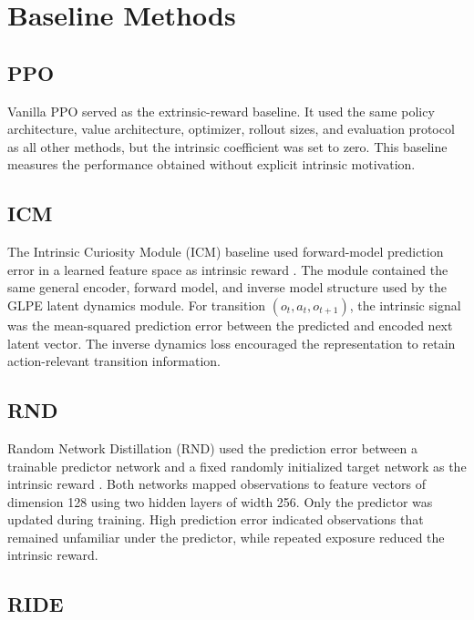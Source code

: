 \section{Baseline Methods}
\label{sec:methodology_baseline_methods}

\subsection{PPO}
\label{subsec:methodology_baseline_ppo}

Vanilla PPO served as the extrinsic-reward baseline.
It used the same policy architecture, value architecture, optimizer, rollout sizes, and evaluation protocol as all other methods, but the intrinsic coefficient was set to zero.
This baseline measures the performance obtained without explicit intrinsic motivation.

\subsection{ICM}
\label{subsec:methodology_baseline_icm}

The Intrinsic Curiosity Module (ICM) baseline used forward-model prediction error in a learned feature space as intrinsic reward \parencite{pathak-2017}.
The module contained the same general encoder, forward model, and inverse model structure used by the GLPE latent dynamics module.
For transition $(o_t,a_t,o_{t+1})$, the intrinsic signal was the mean-squared prediction error between the predicted and encoded next latent vector.
The inverse dynamics loss encouraged the representation to retain action-relevant transition information.

\subsection{RND}
\label{subsec:methodology_baseline_rnd}

Random Network Distillation (RND) used the prediction error between a trainable predictor network and a fixed randomly initialized target network as the intrinsic reward \parencite{burda-2018B,burda-2018A}.
Both networks mapped observations to feature vectors of dimension 128 using two hidden layers of width 256.
Only the predictor was updated during training.
High prediction error indicated observations that remained unfamiliar under the predictor, while repeated exposure reduced the intrinsic reward.

\subsection{RIDE}
\label{subsec:methodology_baseline_ride}


